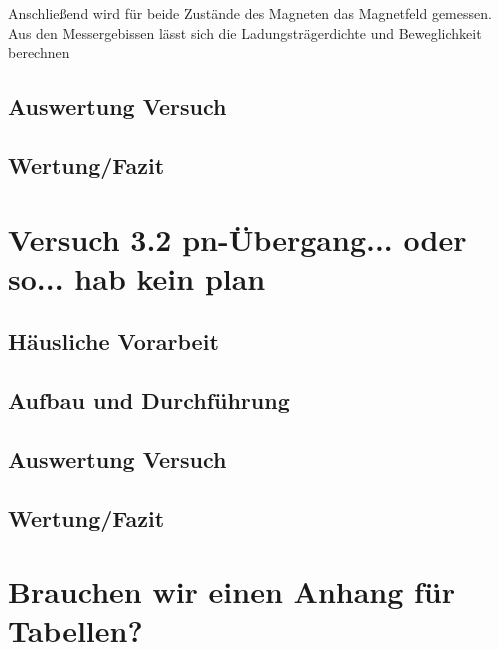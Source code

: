 \documentclass[a4paper]{scrartcl}
\numberwithin{equation}{subsection}
\begin{document}
Anschließend wird für beide Zustände des Magneten das Magnetfeld gemessen. \\

Aus den Messergebissen lässt sich die Ladungsträgerdichte und Beweglichkeit berechnen

\newpage

\subsection{Auswertung Versuch}

\newpage

\subsection{Wertung/Fazit}

\newpage


\section{Versuch 3.2 pn-Übergang... oder so... hab kein plan}
\subsection{Häusliche Vorarbeit}

\newpage

\subsection{Aufbau und Durchführung}

\newpage

\subsection{Auswertung Versuch}

\newpage

\subsection{Wertung/Fazit}

\newpage

\section{Brauchen wir einen Anhang für Tabellen?}

\newpage






\label{LastPage}
\end{document}
